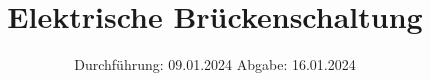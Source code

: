 

\subject{V302}
\title{Elektrische Brückenschaltung}
\date{%
  Durchführung: 09.01.2024
  \hspace{3em}
  Abgabe: 16.01.2024
}



\maketitle
\thispagestyle{empty}
\tableofcontents
\newpage






\printbibliography{}
\appendix
\setcounter{secnumdepth}{0}

